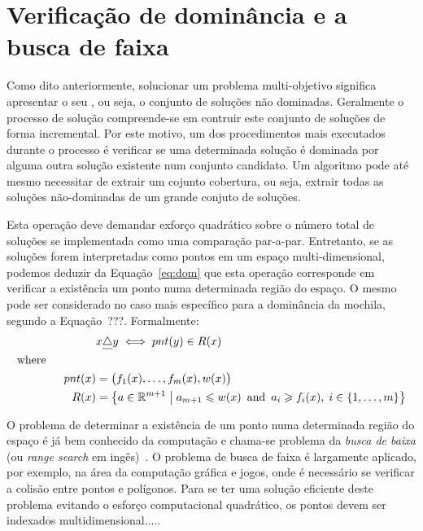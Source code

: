 
\section{Verificação de dominância e a busca de faixa}

Como dito anteriormente, solucionar um problema multi-objetivo significa
apresentar o seu \paretoset{}, ou seja, o conjunto de soluções não dominadas.
Geralmente o processo de solução compreende-se em contruir este conjunto de
soluções de forma incremental.
Por este motivo, um dos procedimentos mais executados durante o processo é
verificar se uma determinada solução é dominada por alguma outra solução
existente num conjunto candidato.
Um algoritmo pode até mesmo necessitar de extrair um cojunto cobertura, ou seja,
extrair todas as soluções não-dominadas de um grande conjuto de soluções.

Esta operação deve demandar exforço quadrático sobre o número total de soluções
se implementada como uma comparação par-a-par.
Entretanto, se as soluções forem interpretadas como pontos em um espaço
multi-dimensional, podemos deduzir da Equação~\ref{eq:dom} que esta operação
corresponde em verificar a existência um ponto numa determinada região
do espaço. O mesmo pode ser considerado no caso mais específico para a dominância
da mochila, segundo a Equação~???.
Formalmente:
\begin{align*}
    & x \underline{\triangle} y \; \Longleftrightarrow \; pnt(y) \in R(x) \\
  \text{where} \phantom{mmmmm} \\
    pnt(x) &= \big(f_{1}(x), \ldots, f_{m}(x), w(x)\big) \\
    R(x) &= \left\{ a \in \mathbb{R}^{m+1} \;\middle|\;
      a_{m+1} \leqslant w(x)
      \, \text{ and } \,
      a_i \geqslant f_{i}(x), \; i \in \{1, \ldots, m\}
      \right\}
\end{align*}


O problema de determinar a existência de um ponto numa determinada região do
espaço é já bem conhecido da computação e chama-se problema da
\emph{busca de baixa} (ou \emph{range search} em ingês)~\cite{agarwal1999geometric}.
O problema de busca de faixa é largamente aplicado, por exemplo, na área da
computação gráfica e jogos, onde é necessário se verificar a colisão entre pontos e polígonos.
Para se ter uma solução eficiente deste problema evitando o esforço computacional
quadrático, os pontos devem ser indexados multidimensional.....

